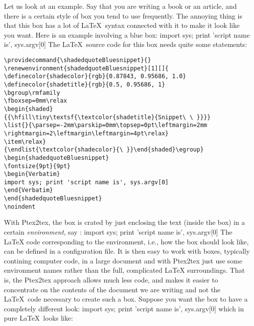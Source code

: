 \documentclass[a4paper,11pt]{article}
\begin{document}
Let us look at an example.
Say that you are writing a book or an article, and there
is a certain style of box you tend to use frequently. The annoying thing is that
this box has a lot of \LaTeX~syntax connected with it to make it look like
you want. Here is an example involving a blue box:
\bsni
import sys; print 'script name is', sys.argv[0]
\esni
The \LaTeX~source code for this box needs quite some statements:
\begin{verbatim}
\providecommand{\shadedquoteBluesnippet}{}
\renewenvironment{shadedquoteBluesnippet}[1][]{
\definecolor{shadecolor}{rgb}{0.87843, 0.95686, 1.0}
\definecolor{shadetitle}{rgb}{0.5, 0.95686, 1}
\bgroup\rmfamily
\fboxsep=0mm\relax
\begin{shaded}
{{\hfill\tiny\textsf{\textcolor{shadetitle}{Snippet\ \ }}}}
\list{}{\parsep=-2mm\parskip=0mm\topsep=0pt\leftmargin=2mm
\rightmargin=2\leftmargin\leftmargin=4pt\relax}
\item\relax}
{\endlist{\textcolor{shadecolor}{\ }}\end{shaded}\egroup}
\begin{shadedquoteBluesnippet}
\fontsize{9pt}{9pt}
\begin{Verbatim}
import sys; print 'script name is', sys.argv[0]
\end{Verbatim}
\end{shadedquoteBluesnippet}
\noindent
\end{verbatim}
\noindent
With Ptex2tex, the box is crated by just enclosing the text (inside the box)
in a certain \emph{environment}, say :
\bdat
\bmybox
import sys; print 'script name is', sys.argv[0]
\emybox
\edat
The \LaTeX{} code corresponding to the  environment, i.e.,
how the box should look like, can be defined in a configuration file. 
It is then easy to work with boxes, typically contining computer code,
in a large document and with Ptex2tex just use some environment names
rather than the full, complicated \LaTeX{} surroundings.
That is,
the
Ptex2tex approach allows much less code, and makes it easier to concentrate on the contents
of the document we are writing and not the \LaTeX~code necessary to create such
a box. 
Suppose you want the box to have a completely different look:
\bcod
import sys; print 'script name is', sys.argv[0]
\ecod
which in pure \LaTeX~looks like:
\end{document}
